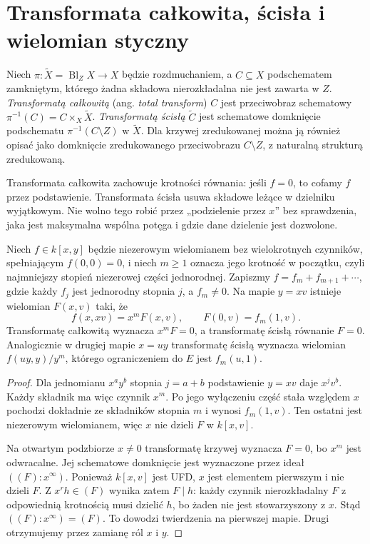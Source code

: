\section{Transformata całkowita, ścisła i wielomian styczny}
\label{sec:ga5-transform}

\begin{definicja}
\label{def:ga5-transform}
Niech $\pi:\widetilde X=\operatorname{Bl}_Z X\to X$
będzie rozdmuchaniem, a $C\subseteq X$ podschematem
zamkniętym, którego żadna składowa nierozkładalna
nie jest zawarta w $Z$. \emph{Transformatą całkowitą}
(ang. \emph{total transform}) $C$ jest przeciwobraz
schematowy $\pi^{-1}(C)=C\times_X\widetilde X$.
\emph{Transformatą ścisłą} $\widetilde C$ jest
schematowe domknięcie podschematu
$\pi^{-1}(C\setminus Z)$ w $\widetilde X$.
Dla krzywej zredukowanej można ją również opisać
jako domknięcie zredukowanego przeciwobrazu
$C\setminus Z$, z naturalną strukturą zredukowaną.
\end{definicja}

\begin{uwaga}
Transformata całkowita zachowuje krotności równania:
jeśli $f=0$, to cofamy $f$ przez podstawienie.
Transformata ścisła usuwa składowe leżące w dzielniku
wyjątkowym. Nie wolno tego robić przez
„podzielenie przez $x$” bez sprawdzenia, jaka jest
maksymalna wspólna potęga i gdzie dane dzielenie
jest dozwolone.
\end{uwaga}

\begin{twierdzenie}
\label{tw:ga5-strict-formula}
Niech $f\in k[x,y]$ będzie niezerowym wielomianem bez
wielokrotnych czynników, spełniającym $f(0,0)=0$,
i niech $m\ge1$ oznacza jego
krotność w początku, czyli najmniejszy stopień
niezerowej części jednorodnej. Zapiszmy
$f=f_m+f_{m+1}+\cdots$, gdzie każdy $f_j$
jest jednorodny stopnia $j$, a $f_m\ne0$.
Na mapie $y=xv$ istnieje wielomian $F(x,v)$ taki, że
\[
 f(x,xv)=x^mF(x,v),\qquad F(0,v)=f_m(1,v).
\]
Transformatę całkowitą wyznacza $x^mF=0$, a transformatę
ścisłą równanie $F=0$. Analogicznie w drugiej mapie
$x=uy$ transformatę ścisłą wyznacza wielomian
$f(uy,y)/y^m$, którego ograniczeniem do $E$ jest
$f_m(u,1)$.
\end{twierdzenie}
\begin{proof}
Dla jednomianu $x^ay^b$ stopnia $j=a+b$ podstawienie
$y=xv$ daje $x^jv^b$. Każdy składnik ma więc czynnik
$x^m$. Po jego wyłączeniu część stała względem $x$
pochodzi dokładnie ze składników stopnia $m$ i wynosi
$f_m(1,v)$. Ten ostatni jest niezerowym wielomianem,
więc $x$ nie dzieli $F$ w $k[x,v]$.

Na otwartym podzbiorze $x\ne0$ transformatę krzywej
wyznacza $F=0$, bo $x^m$ jest odwracalne.
Jej schematowe domknięcie jest wyznaczone przez ideał
$((F):x^\infty)$. Ponieważ $k[x,v]$ jest UFD,
$x$ jest elementem pierwszym i nie dzieli $F$.
Z $x^r h\in(F)$ wynika zatem $F\mid h$:
każdy czynnik nierozkładalny $F$ z odpowiednią
krotnością musi dzielić $h$, bo żaden nie jest
stowarzyszony z $x$. Stąd $((F):x^\infty)=(F)$.
To dowodzi twierdzenia na pierwszej mapie.
Drugi otrzymujemy przez zamianę ról $x$ i $y$.
\end{proof}

